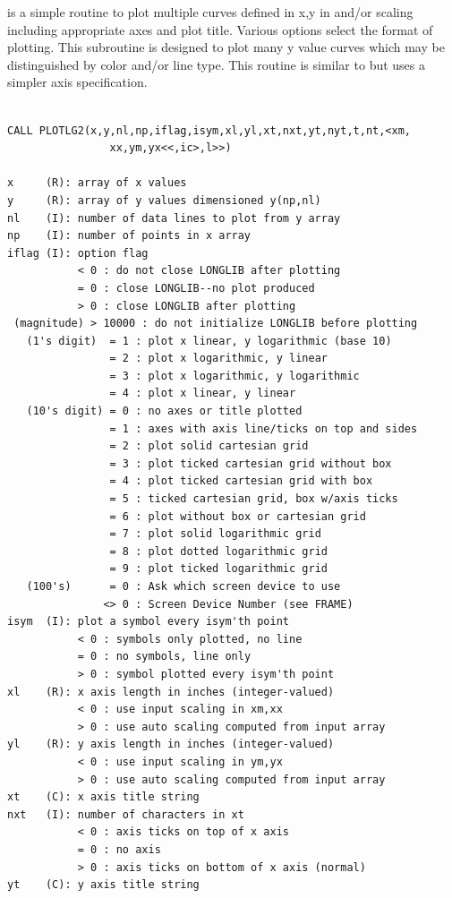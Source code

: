 \documentclass[11pt]{report}
\begin{document}
 is a simple routine to
plot multiple curves defined in x,y in  and/or 
scaling including appropriate axes and plot title.  Various options
select the format of plotting. This subroutine is designed to plot
many y value curves which may be distinguished by color and/or line
type.  This routine is similar to  but uses a simpler
axis specification.
\begin{verbatim}

CALL PLOTLG2(x,y,nl,np,iflag,isym,xl,yl,xt,nxt,yt,nyt,t,nt,<xm,
                xx,ym,yx<<,ic>,l>>)

x     (R): array of x values
y     (R): array of y values dimensioned y(np,nl)
nl    (I): number of data lines to plot from y array
np    (I): number of points in x array
iflag (I): option flag
           < 0 : do not close LONGLIB after plotting
           = 0 : close LONGLIB--no plot produced
           > 0 : close LONGLIB after plotting
 (magnitude) > 10000 : do not initialize LONGLIB before plotting
   (1's digit)  = 1 : plot x linear, y logarithmic (base 10)
                = 2 : plot x logarithmic, y linear
                = 3 : plot x logarithmic, y logarithmic
                = 4 : plot x linear, y linear
   (10's digit) = 0 : no axes or title plotted
                = 1 : axes with axis line/ticks on top and sides
                = 2 : plot solid cartesian grid
                = 3 : plot ticked cartesian grid without box
                = 4 : plot ticked cartesian grid with box
                = 5 : ticked cartesian grid, box w/axis ticks
                = 6 : plot without box or cartesian grid
                = 7 : plot solid logarithmic grid
                = 8 : plot dotted logarithmic grid
                = 9 : plot ticked logarithmic grid
   (100's)      = 0 : Ask which screen device to use
               <> 0 : Screen Device Number (see FRAME)
isym  (I): plot a symbol every isym'th point
           < 0 : symbols only plotted, no line
           = 0 : no symbols, line only
           > 0 : symbol plotted every isym'th point
xl    (R): x axis length in inches (integer-valued)
           < 0 : use input scaling in xm,xx
           > 0 : use auto scaling computed from input array
yl    (R): y axis length in inches (integer-valued)
           < 0 : use input scaling in ym,yx
           > 0 : use auto scaling computed from input array
xt    (C): x axis title string
nxt   (I): number of characters in xt
           < 0 : axis ticks on top of x axis
           = 0 : no axis
           > 0 : axis ticks on bottom of x axis (normal)
yt    (C): y axis title string

\end{verbatim}
\end{document}
